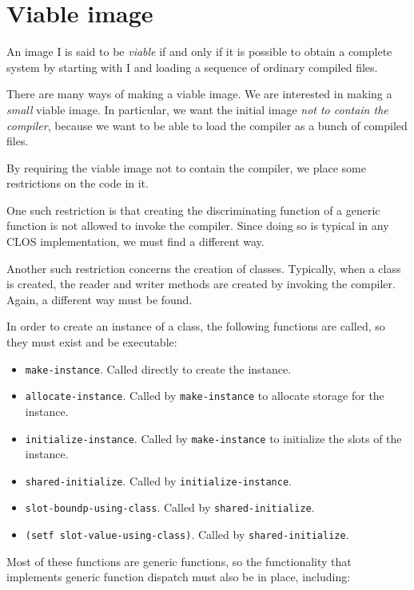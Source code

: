 \section{Viable image}
\label{sec-bootstrapping-viable-image}

An image I is said to be \emph{viable} if and only if it is possible
to obtain a complete \commonlisp{} system by starting with I and loading a
sequence of ordinary compiled files.

There are many ways of making a viable image.  We are interested in
making a \emph{small} viable image.  In particular, we want the
initial image \emph{not to contain the compiler}, because we want to
be able to load the compiler as a bunch of compiled files. 

By requiring the viable image not to contain the compiler, we place
some restrictions on the code in it.  

One such restriction is that creating the discriminating function of a
generic function is not allowed to invoke the compiler.  Since doing
so is typical in any CLOS implementation, we must find a different
way.

Another such restriction concerns the creation of classes.  Typically,
when a class is created, the reader and writer methods are created by
invoking the compiler.  Again, a different way must be found.

In order to create an instance of a class, the following functions
are called, so they must exist and be executable:

\begin{itemize}
\item \texttt{make-instance}.  Called directly to create the instance.
\item \texttt{allocate-instance}.  Called by \texttt{make-instance} to
  allocate storage for the instance.
\item \texttt{initialize-instance}.  Called by \texttt{make-instance}
  to initialize the slots of the instance.
\item \texttt{shared-initialize}.  Called by
  \texttt{initialize-instance}.
\item \texttt{slot-boundp-using-class}.  Called by \texttt{shared-initialize}.
\item \texttt{(setf slot-value-using-class)}.  Called by
  \texttt{shared-initialize}.
\end{itemize}

Most of these functions are generic functions, so the functionality
that implements generic function dispatch must also be in place,
including:

